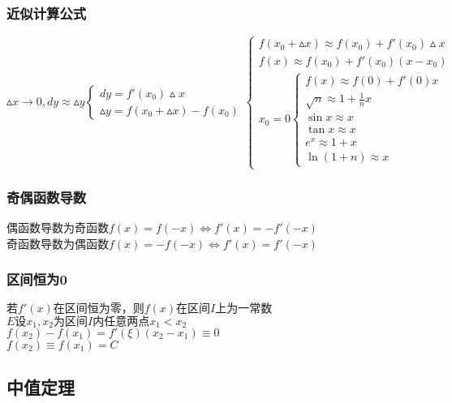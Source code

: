 \subsubsection{近似计算公式}
\begin{center}
    $\vartriangle x\rightarrow 0, dy\approx \vartriangle y\begin{cases}
        dy=f'(x_0)\vartriangle x\\
        \vartriangle y=f(x_0+\vartriangle x)-f(x_0)
    \end{cases}\begin{cases}
        f(x_0+\vartriangle x)\approx f(x_0)+f'(x_0)\vartriangle x\\
        f(x)\approx f(x_0)+f'(x_0)(x-x_0)\\
        x_0=0\begin{cases}
            f(x)\approx f(0)+f'(0)x\\
            \sqrt{n}\approx 1+\frac{1}{n}x\\
            \sin x \approx x\\
            \tan x \approx x\\
            e^x \approx 1+x\\
            \ln(1+n)\approx x
        \end{cases}
    \end{cases}$\\
\end{center}
\subsubsection{奇偶函数导数}
\begin{center}
    偶函数导数为奇函数$f(x)=f(-x)\Leftrightarrow f'(x)=-f'(-x)$\\
    奇函数导数为偶函数$f(x)=-f(-x)\Leftrightarrow f'(x)=f'(-x)$
\end{center}
\subsubsection{区间恒为0}
\begin{center}
    $\mbox{若}f'(x)\mbox{在区间恒为零，则}f(x)\mbox{在区间}I\mbox{上为一常数}$\\
$E\mbox{设}x_1,x_2\mbox{为区间}I\mbox{内任意两点}x_1<x_2$\\
$f(x_2)-f(x_1)=f'(\xi)(x_2-x_1)\equiv 0 $\\
$f(x_2)\equiv f(x_1)=C$
\end{center}

\subsection{中值定理}
